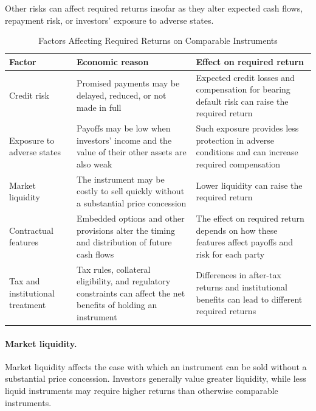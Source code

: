 Other risks can affect required returns insofar as they alter expected cash flows, repayment risk, or investors' exposure to adverse states.


\begin{table}[htbp]
\centering
\caption{Factors Affecting Required Returns on Comparable Instruments}
\label{tab:ch6-rate-differences}

\begin{tabularx}{\textwidth}{@{}p{3.2cm}Y Y@{}}
\toprule
\textbf{Factor} &
\textbf{Economic reason} &
\textbf{Effect on required return} \\
\midrule

Credit risk &
Promised payments may be delayed, reduced, or not made in full &
Expected credit losses and compensation for bearing default risk can raise the required return \\

Exposure to adverse states &
Payoffs may be low when investors' income and the value of their other assets are also weak &
Such exposure provides less protection in adverse conditions and can increase required compensation \\

Market liquidity &
The instrument may be costly to sell quickly without a substantial price concession &
Lower liquidity can raise the required return \\

Contractual features &
Embedded options and other provisions alter the timing and distribution of future cash flows &
The effect on required return depends on how these features affect payoffs and risk for each party \\

Tax and institutional treatment &
Tax rules, collateral eligibility, and regulatory constraints can affect the net benefits of holding an instrument &
Differences in after-tax returns and institutional benefits can lead to different required returns \\

\bottomrule
\end{tabularx}
\end{table}

\paragraph{Market liquidity.}

Market liquidity affects the ease with which an instrument can be sold without a substantial price concession. Investors generally value greater liquidity, while less liquid instruments may require higher returns than otherwise comparable instruments.

